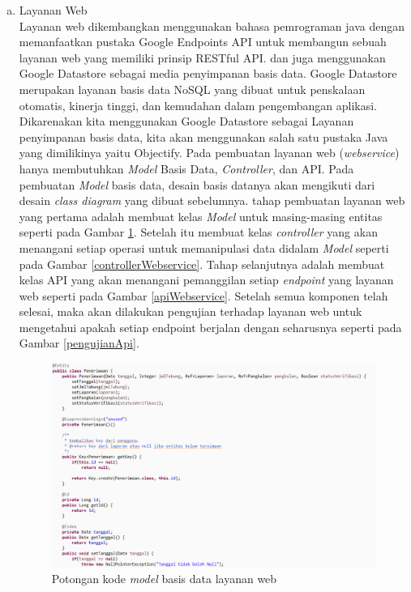 	\begin{enumerate}[a.]
		\item Layanan Web
		\\ Layanan web dikembangkan menggunakan bahasa pemrograman java dengan memanfaatkan pustaka Google Endpoints API untuk membangun sebuah layanan web yang memiliki prinsip RESTful API. dan juga menggunakan Google Datastore sebagai media penyimpanan basis data. Google Datastore merupakan layanan basis data NoSQL yang dibuat untuk penskalaan otomatis, kinerja tinggi, dan kemudahan dalam pengembangan aplikasi. Dikarenakan kita menggunakan Google Datastore sebagai Layanan penyimpanan basis data, kita akan menggunakan salah satu pustaka Java yang dimilikinya yaitu Objectify. Pada pembuatan layanan web (\textit{webservice}) hanya membutuhkan \textit{Model} Basis Data, \textit{Controller}, dan API. Pada pembuatan \textit{Model} basis data, desain basis datanya akan mengikuti dari desain \textit{class diagram} yang dibuat sebelumnya. tahap pembuatan layanan web yang pertama adalah membuat kelas \textit{Model} untuk masing-masing entitas seperti pada Gambar \ref{modelWebservice}. Setelah itu membuat kelas \textit{controller} yang akan menangani setiap operasi untuk memanipulasi data didalam \textit{Model} seperti pada Gambar \ref{controllerWebservice}. Tahap selanjutnya adalah membuat kelas API yang akan menangani pemanggilan setiap \textit{endpoint} yang layanan web seperti pada Gambar \ref{apiWebservice}. Setelah semua komponen telah selesai, maka akan dilakukan pengujian terhadap layanan web untuk mengetahui apakah setiap endpoint berjalan dengan seharusnya seperti pada Gambar \ref{pengujianApi}.
		
		\vspace{-0.4cm}
		\begin{figure}[H]
			\center
			\includegraphics [width = 12cm]{gambar/kode/model-webservice}
			\caption{Potongan kode \textit{model} basis data layanan web}
			\label{modelWebservice}
		\end{figure}
	

\end{enumerate}
